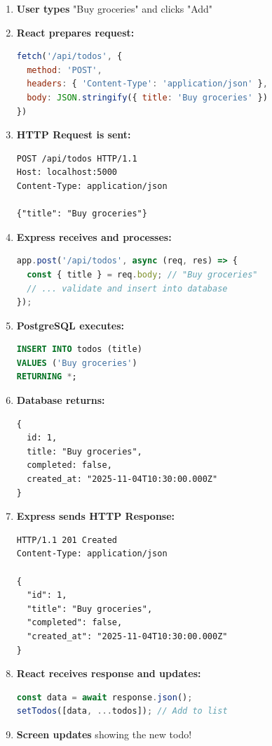 \documentclass[12pt,a4paper]{article}
\begin{document}
\begin{enumerate}
    \item \textbf{User types} "Buy groceries" and clicks "Add"
    
    \item \textbf{React prepares request:}
    \begin{lstlisting}[language=JavaScript, numbers=none]
fetch('/api/todos', {
  method: 'POST',
  headers: { 'Content-Type': 'application/json' },
  body: JSON.stringify({ title: 'Buy groceries' })
})
    \end{lstlisting}
    
    \item \textbf{HTTP Request is sent:}
    \begin{lstlisting}[numbers=none]
POST /api/todos HTTP/1.1
Host: localhost:5000
Content-Type: application/json

{"title": "Buy groceries"}
    \end{lstlisting}
    
    \item \textbf{Express receives and processes:}
    \begin{lstlisting}[language=JavaScript, numbers=none]
app.post('/api/todos', async (req, res) => {
  const { title } = req.body; // "Buy groceries"
  // ... validate and insert into database
});
    \end{lstlisting}
    
    \item \textbf{PostgreSQL executes:}
    \begin{lstlisting}[language=SQL, numbers=none]
INSERT INTO todos (title) 
VALUES ('Buy groceries') 
RETURNING *;
    \end{lstlisting}
    
    \item \textbf{Database returns:}
    \begin{lstlisting}[numbers=none]
{
  id: 1,
  title: "Buy groceries",
  completed: false,
  created_at: "2025-11-04T10:30:00.000Z"
}
    \end{lstlisting}
    
    \item \textbf{Express sends HTTP Response:}
    \begin{lstlisting}[numbers=none]
HTTP/1.1 201 Created
Content-Type: application/json

{
  "id": 1,
  "title": "Buy groceries",
  "completed": false,
  "created_at": "2025-11-04T10:30:00.000Z"
}
    \end{lstlisting}
    
    \item \textbf{React receives response and updates:}
    \begin{lstlisting}[language=JavaScript, numbers=none]
const data = await response.json();
setTodos([data, ...todos]); // Add to list
    \end{lstlisting}
    
    \item \textbf{Screen updates} showing the new todo!
\end{enumerate}
\end{document}
